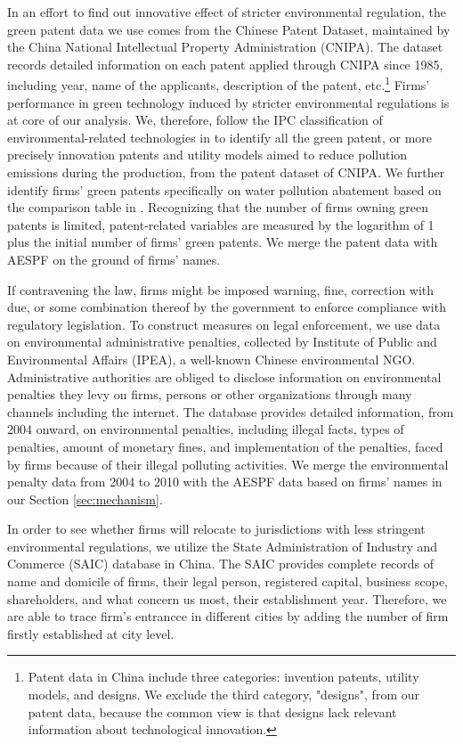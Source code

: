 \documentclass[12pt,english]{article}
\begin{document}
In an effort to find out innovative effect of stricter environmental regulation, the green patent data we use comes from the Chinese Patent Dataset, maintained by the China National Intellectual Property Administration (CNIPA). The dataset records detailed information on each patent applied through CNIPA since 1985, including year, name of the applicants, description of the patent, etc.\footnote{Patent data in China include three categories: invention patents, utility models, and designs. We exclude the third category, "designs", from our patent data, because the common view is that designs lack relevant information about technological innovation.} Firms' performance in green technology induced by stricter environmental regulations is at core of our analysis. We, therefore, follow the IPC classification of environmental-related technologies in \citet*{havsvcivc2015measuring} to identify all the green patent, or more precisely innovation patents and utility models aimed to reduce pollution emissions during the production, from the patent dataset of CNIPA. We further identify firms' green patents specifically on water pollution abatement based on the comparison table in \citet*{havsvcivc2015measuring}. Recognizing that the number of firms owning green patents is limited, patent-related variables are measured by the logarithm of 1 plus the initial number of firms' green patents. We merge the patent data with AESPF on the ground of firms' names.

If contravening the law, firms might be imposed warning, fine, correction with due, or some combination thereof by the government to enforce compliance with regulatory legislation. To construct measures on legal enforcement, we use data on environmental administrative penalties, collected by Institute of Public and Environmental Affairs (IPEA), a well-known Chinese environmental NGO. Administrative authorities are obliged to disclose information on environmental penalties they levy on firms, persons or other organizations through many channels including the internet. The database provides detailed information, from 2004 onward, on environmental penalties, including illegal facts, types of penalties, amount of monetary fines, and implementation of the penalties, faced by firms because of their illegal polluting activities. We merge the environmental penalty data from 2004 to 2010 with the AESPF data based on firms' names in our Section \ref{sec:mechanism}.

In order to see whether firms will relocate to jurisdictions with less stringent environmental regulations, we utilize the State Administration of Industry and Commerce (SAIC) database in China. The SAIC provides complete records of name and domicile of firms, their legal person, registered capital, business scope, shareholders, and what concern us most, their establishment year. Therefore, we are able to trace firm's entrancce in different cities by adding the number of firm firstly established at city level.
\end{document}
